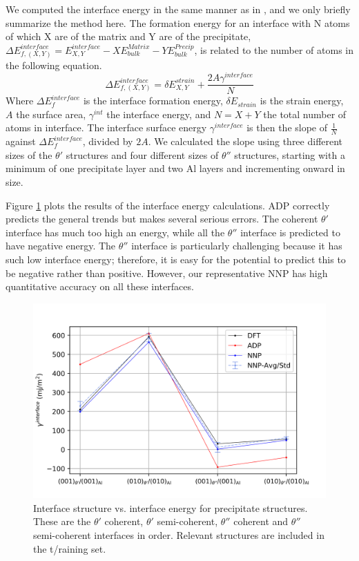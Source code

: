 \documentclass{article}
\begin{document}
We computed the interface energy in the same manner as in \cite{Vaithyanathan2004MultiscaleAlloys}, and we only briefly summarize the method here.
The formation energy for an interface with N atoms of which X are of the matrix and Y are of the precipitate,
$\Delta E^{interface}_{f, (X,Y)} = E^{interface}_{X,Y}-XE^{Matrix}_{bulk}-YE^{Precip}_{bulk}$,
is related to the number of atoms in the following equation. 
\begin{equation}
\Delta E^{interface}_{f,(X,Y)} = \delta E^{strain}_{X,Y} + \frac{2A\gamma^{interface}}{N}
\end{equation}
Where $\Delta E^{interface}_f$ is the interface formation energy, $\delta E_{strain}$ is the strain energy, $A$ the surface area,
$\gamma^{int}$ the interface energy, and $N=X+Y$ the total number of atoms in interface.
The interface surface energy $\gamma^{interface}$ is then the slope of $\frac{1}{N}$ against
$\Delta E^{interface}_f$, divided by $2A$.
We calculated the slope using three different sizes of the $\theta'$ structures and four different sizes of $\theta''$ structures, starting with a minimum of one precipitate layer and two Al layers and incrementing onward in size. 




Figure \ref{fig:interface_energies} plots the results of the interface energy calculations.
ADP correctly predicts the general trends but makes several serious errors.
The coherent $\theta'$ interface has much too high an energy, while all the $\theta''$ interface is predicted to have negative energy.
The $\theta''$ interface is particularly challenging because it has such low interface energy; therefore, it is easy for the potential to predict this to be negative rather than positive.
However, our representative NNP has high quantitative accuracy on all these interfaces.

\begin{figure}[H]%
\centering%
\includegraphics[width=1\textwidth,center]{./figures/interface_energies.png}%
\caption{Interface structure vs. interface energy for precipitate structures. 
These are the $\theta'$ coherent, $\theta'$ semi-coherent, $\theta''$ coherent and $\theta''$ semi-coherent
interfaces in order. Relevant structures are included in the t/raining set.}%
\label{fig:interface_energies}
\end{figure}
\end{document}
